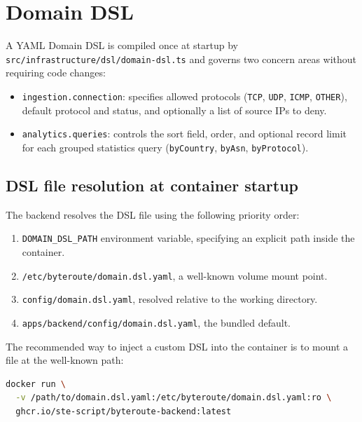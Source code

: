 \documentclass[12pt]{report}
\begin{document}
\section{Domain DSL}

A YAML Domain DSL is compiled once at startup by
\texttt{src/infrastructure/dsl/domain-dsl.ts} and governs two concern areas without
requiring code changes:

\begin{itemize}
    \item \texttt{ingestion.connection}: specifies allowed protocols
          (\texttt{TCP}, \texttt{UDP}, \texttt{ICMP}, \texttt{OTHER}), default protocol and
          status, and optionally a list of source IPs to deny.
    \item \texttt{analytics.queries}: controls the sort field, order, and optional record
          limit for each grouped statistics query (\texttt{byCountry}, \texttt{byAsn},
          \texttt{byProtocol}).
\end{itemize}

\subsection*{DSL file resolution at container startup}

The backend resolves the DSL file using the following priority order:

\begin{enumerate}
      \item \texttt{DOMAIN\_DSL\_PATH} environment variable, specifying an explicit path inside the container.
      \item \texttt{/etc/byteroute/domain.dsl.yaml}, a well-known volume mount point.
      \item \texttt{config/domain.dsl.yaml}, resolved relative to the working directory.
      \item \texttt{apps/backend/config/domain.dsl.yaml}, the bundled default.
\end{enumerate}

The recommended way to inject a custom DSL into the container is to mount a file at the
well-known path:

\begin{lstlisting}[language=bash, caption={Mounting a custom domain DSL via Docker volume.}, label=lst:dsl-mount]
docker run \
  -v /path/to/domain.dsl.yaml:/etc/byteroute/domain.dsl.yaml:ro \
  ghcr.io/ste-script/byteroute-backend:latest
\end{lstlisting}
\end{document}
